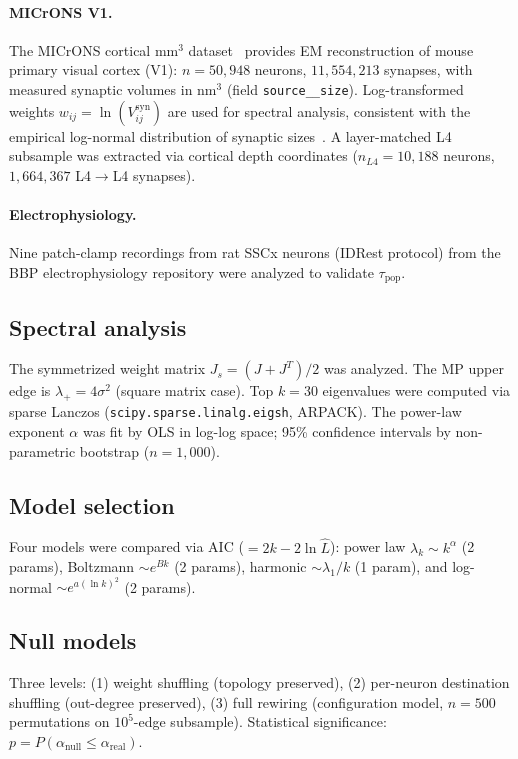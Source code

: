 \documentclass[aps,pre,twocolumn,showpacs,superscriptaddress,longbibliography]{revtex4-2}
\newcommand{\lp}{\lambda_{+}}
\newcommand{\taupop}{\tau_{\mathrm{pop}}}
\begin{document}
\paragraph{MICrONS V1.}
The MICrONS cortical mm$^3$ dataset~\cite{MICrONS2021} provides
EM reconstruction of mouse primary visual cortex (V1):
$n = 50{,}948$ neurons, $11{,}554{,}213$ synapses, with measured
synaptic volumes in nm$^3$ (field \texttt{source\_\_size}).
Log-transformed weights $w_{ij} = \ln(V_{ij}^{\mathrm{syn}})$
are used for spectral analysis, consistent with the empirical
log-normal distribution of synaptic sizes~\cite{Bhatt2009}.
A layer-matched L4 subsample was extracted via cortical depth
coordinates ($n_{L4} = 10{,}188$ neurons,
$1{,}664{,}367$ L4$\to$L4 synapses).

\paragraph{Electrophysiology.}
Nine patch-clamp recordings from rat SSCx neurons (IDRest protocol)
from the BBP electrophysiology repository were analyzed to validate
$\taupop$.

\subsection{Spectral analysis}

The symmetrized weight matrix $J_s = (J + J^T)/2$ was analyzed.
The MP upper edge is $\lp = 4\sigma^2$ (square matrix case).
Top $k=30$ eigenvalues were computed via sparse Lanczos
(\texttt{scipy.sparse.linalg.eigsh}, ARPACK).
The power-law exponent $\alpha$ was fit by OLS in log-log space;
95\% confidence intervals by non-parametric bootstrap ($n=1{,}000$).

\subsection{Model selection}

Four models were compared via AIC ($= 2k - 2\ln\hat{L}$):
power law $\lambda_k \sim k^\alpha$ (2 params),
Boltzmann $\sim e^{Bk}$ (2 params),
harmonic $\sim \lambda_1/k$ (1 param),
and log-normal $\sim e^{a(\ln k)^2}$ (2 params).

\subsection{Null models}

Three levels: (1) weight shuffling (topology preserved),
(2) per-neuron destination shuffling (out-degree preserved),
(3) full rewiring (configuration model, $n=500$ permutations
on $10^5$-edge subsample). Statistical significance:
$p = P(\alpha_{\mathrm{null}} \leq \alpha_{\mathrm{real}})$.
\end{document}
